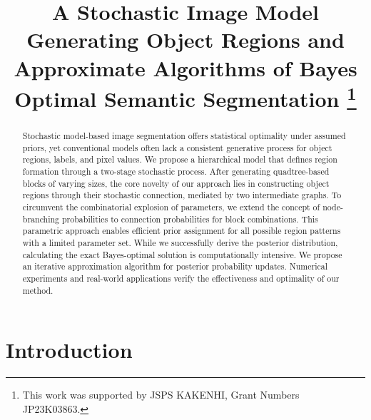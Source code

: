 \documentclass[conference]{IEEEtran}
\theoremstyle{definition}
\begin{document}
\title{A Stochastic Image Model Generating Object Regions and Approximate Algorithms of Bayes Optimal Semantic Segmentation
\thanks{This work was supported by JSPS KAKENHI, Grant Numbers JP23K03863.}
}

\author{
\and
{}
\and
{}
}


\maketitle

\begin{abstract}

Stochastic model-based image segmentation offers statistical optimality under assumed priors, yet conventional models often lack a consistent generative process for object regions, labels, and pixel values. 
We propose a hierarchical model that defines region formation through a two-stage stochastic process. 
After generating quadtree-based blocks of varying sizes, the core novelty of our approach lies in constructing object regions through their stochastic connection, mediated by two intermediate graphs.
To circumvent the combinatorial explosion of parameters, we extend the concept of node-branching probabilities to connection probabilities for block combinations. 
This parametric approach enables efficient prior assignment for all possible region patterns with a limited parameter set. 
While we successfully derive the posterior distribution, calculating the exact Bayes-optimal solution is computationally intensive. 
We propose an iterative approximation algorithm for posterior probability updates. Numerical experiments and real-world applications verify the effectiveness and optimality of our method.

\end{abstract}

\section{Introduction}
\end{document}
